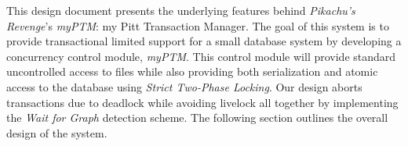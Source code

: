 This design document presents the underlying features behind \textit{Pikachu's Revenge}'s \textit{myPTM}: my Pitt Transaction Manager. The goal of this system is to provide transactional limited support for a small database system by developing a concurrency control module, \textit{myPTM}. This control module will provide standard uncontrolled access to files while also providing both serialization and atomic access to the database using \textit{Strict Two-Phase Locking}. Our design aborts transactions due to deadlock while avoiding livelock all together by implementing the \textit{Wait for Graph} detection scheme. The following section outlines the overall design of the system.